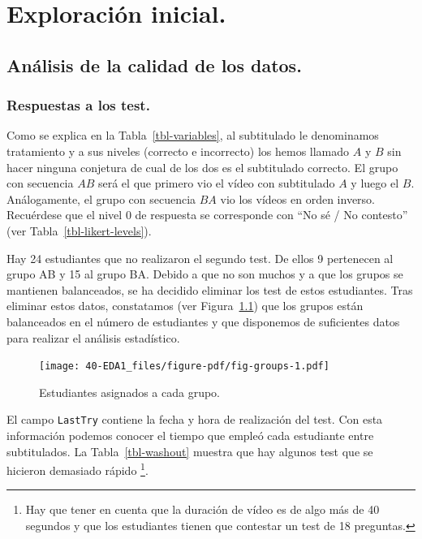 \documentclass[
  12pt,
  a4paper,
  extrafontsizes,
  onecolumn,
  openright]{memoir}
\begin{document}

\hypertarget{sec-eda}{%
\chapter{Exploración inicial.}\label{sec-eda}}

\hypertarget{anuxe1lisis-de-la-calidad-de-los-datos.}{%
\section{Análisis de la calidad de los
datos.}\label{anuxe1lisis-de-la-calidad-de-los-datos.}}

\hypertarget{sec-eda-2}{%
\subsection{Respuestas a los test.}\label{sec-eda-2}}

Como se explica en la Tabla~\ref{tbl-variables}, al subtitulado le
denominamos tratamiento y a sus niveles (correcto e incorrecto) los
hemos llamado \(A\) y \(B\) sin hacer ninguna conjetura de cual de los
dos es el subtitulado correcto. El grupo con secuencia \(AB\) será el
que primero vio el vídeo con subtitulado \(A\) y luego el \(B\).
Análogamente, el grupo con secuencia \(BA\) vio los vídeos en orden
inverso. Recuérdese que el nivel 0 de respuesta se corresponde con
\enquote{No sé / No contesto} (ver Tabla~\ref{tbl-likert-levels}).

Hay 24 estudiantes que no realizaron el segundo test. De ellos 9
pertenecen al grupo AB y 15 al grupo BA. Debido a que no son muchos y a
que los grupos se mantienen balanceados, se ha decidido eliminar los
test de estos estudiantes. Tras eliminar estos datos, constatamos (ver
Figura~\ref{fig-groups}) que los grupos están balanceados en el número
de estudiantes y que disponemos de suficientes datos para realizar el
análisis estadístico.

\begin{figure}[h]

{\centering \texttt{[image: 40-EDA1\_files/figure-pdf/fig-groups-1.pdf]}

}

\caption{\label{fig-groups}Estudiantes asignados a cada grupo.}

\end{figure}

El campo \texttt{LastTry} contiene la fecha y hora de realización del
test. Con esta información podemos conocer el tiempo que empleó cada
estudiante entre subtitulados. La Tabla~\ref{tbl-washout} muestra que
hay algunos test que se hicieron demasiado rápido \footnote{Hay que
  tener en cuenta que la duración de vídeo es de algo más de 40 segundos
  y que los estudiantes tienen que contestar un test de 18 preguntas.}.
\end{document}

